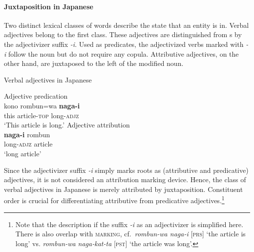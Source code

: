 \paragraph*{Juxtaposition in Japanese}
Two distinct lexical classes of words describe the state that an entity is in. Verbal adjectives belong to the first class. These adjectives are distinguished from s by the adjectivizer suffix \textit{-i}. Used as predicates, the adjectivized verbs marked with \textit{-i} follow the noun but do not require any copula. Attributive adjectives, on the other hand, are juxtaposed to the left of the modified noun. 
\begin{exe}
\ex \rm{Verbal adjectives in Japanese \citep[170]{backhouse1984}}
\begin{xlist}
\ex \rm{Adjective predication}\\
\gll	kono rombun=wa \textbf{naga-i}\\
	this article-\textsc{top} long-\textsc{adjz}\\
\glt	‘This article is long.’
\ex \rm{Adjective attribution}\\
\gll	\textbf{naga-i} rombun\\
	long-\textsc{adjz} article\\
\glt	‘long article’
\end{xlist}
\end{exe}
Since the adjectivizer suffix \textit{-i} simply marks  roots as (attributive and predicative) adjectives, it is not considered an attribution marking device. Hence, the class of verbal adjectives in Japanese is merely attributed by juxtaposition. Constituent order is crucial for differentiating attributive from predicative adjectives.\footnote{Note that the description if the suffix \textit{-i} as an adjectivizer is simplified here. There is also overlap with \textsc{ marking}, cf.~\textit{rombun-wa naga-i} [\textsc{prs}] ‘the article is long’ vs. \textit{rombun-wa naga‑kat-ta} [\textsc{pst}] ‘the article was long’.}

